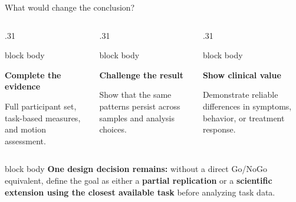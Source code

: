 \documentclass[aspectratio=169,10pt]{beamer}
\begin{document}
\begin{frame}{What would change the conclusion?}
\begin{columns}[T,onlytextwidth]
  \begin{column}{.31\textwidth}
    \begin{beamercolorbox}[rounded=true,sep=.32cm]{block body}
      \centering{\color{Blue}\Large\faDatabase}\par\vspace{.14cm}
      {\color{Navy}\large\bfseries Complete the evidence}\par\vspace{.14cm}
      \small Full participant set, task-based measures, and motion assessment.
    \end{beamercolorbox}
  \end{column}
  \begin{column}{.31\textwidth}
    \begin{beamercolorbox}[rounded=true,sep=.32cm]{block body}
      \centering{\color{Amber}\Large\faVials}\par\vspace{.14cm}
      {\color{Navy}\large\bfseries Challenge the result}\par\vspace{.14cm}
      \small Show that the same patterns persist across samples and analysis choices.
    \end{beamercolorbox}
  \end{column}
  \begin{column}{.31\textwidth}
    \begin{beamercolorbox}[rounded=true,sep=.32cm]{block body}
      \centering{\color{Teal}\Large\faHeartbeat}\par\vspace{.14cm}
      {\color{Navy}\large\bfseries Show clinical value}\par\vspace{.14cm}
      \small Demonstrate reliable differences in symptoms, behavior, or treatment response.
    \end{beamercolorbox}
  \end{column}
\end{columns}

\vspace{.48cm}
\begin{beamercolorbox}[rounded=true,sep=.30cm]{block body}
  {\color{Amber}\bfseries One design decision remains:}\quad
  \small without a direct Go/NoGo equivalent, define the goal as either a \textbf{partial replication} or a \textbf{scientific extension using the closest available task} before analyzing task data.
\end{beamercolorbox}

\vspace{.45cm}
\end{frame}
\end{document}
